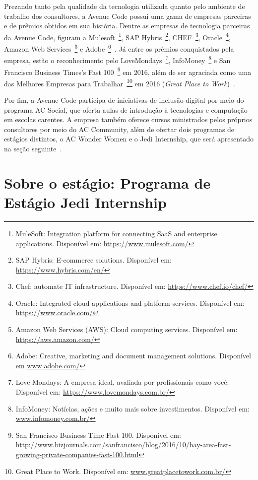 Prezando tanto pela qualidade da tecnologia utilizada quanto pelo ambiente de trabalho dos consultores, a Avenue Code possui uma gama de empresas parceiras e de prêmios obtidos em sua história. Dentre as empresas de tecnologia parceiras da Avenue Code, figuram a Mulesoft~\footnote{MuleSoft: Integration platform for connecting SaaS and enterprise applications. Disponível em: \url{https://www.mulesoft.com/}}, SAP Hybris~\footnote{SAP Hybris: E-commerce solutions. Disponível em: \url{https://www.hybris.com/en/}}, CHEF~\footnote{Chef: automate IT infrastructure. Disponível em: \url{https://www.chef.io/chef/}}, Oracle~\footnote{Oracle: Integrated cloud applications and platform services. Disponível em: \url{https://www.oracle.com/}}, Amazon Web Services~\footnote{Amazon Web Services (AWS): Cloud computing services. Disponível em: \url{https://aws.amazon.com/}} e Adobe~\footnote{Adobe: Creative, marketing and document management solutions. Disponível em \url{www.adobe.com/}}~\cite{ac-partners-2017}. Já entre os prêmios conquistados pela empresa, estão o reconhecimento pelo LoveMondays~\footnote{Love Mondays: A empresa ideal, avaliada por profissionais como você. Disponível em: \url{https://www.lovemondays.com.br/}}, InfoMoney~\footnote{InfoMoney: Notícias, ações e muito mais sobre investimentos. Disponível em: \url{www.infomoney.com.br/}} e San Francisco Business Times's Fast 100~\footnote{San Francisco Business Time Fast 100. Disponível em: \url{http://www.bizjournals.com/sanfrancisco/blog/2016/10/bay-area-fast-growing-private-companies-fast-100.html}} em 2016, além de ser agraciada como uma das Melhores Empresas para Trabalhar~\footnote{Great Place to Work. Disponível em: \url{www.greatplacetowork.com.br/}} em 2016 (\textit{Great Place to Work})~\cite{ac-who-we-are-2017}.

Por fim, a Avenue Code participa de iniciativas de inclusão digital por meio do programa AC Social, que oferta aulas de introdução à tecnologias e computação em escolas carentes. A empresa também oferece cursos ministrados pelos próprios consultores por meio do AC Community, além de ofertar dois programas de estágios distintos, o AC Wonder Women e o Jedi Internship, que será apresentado na seção seguinte~\cite{ac-academy-2017}.

\section{Sobre o estágio: Programa de Estágio Jedi Internship}
\label{sec:sobre-o-estagio}

